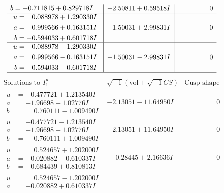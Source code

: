 \documentclass[1p]{elsarticle_modified}
\theoremstyle{definition}
\newcommand{\I}{\sqrt{-1}}
\begin{document}
$$\begin{array}{c|c|c}
\begin{aligned}
b &= -0.711815 + 0.829718 I\end{aligned}
 & -2.50811 + 0.59518 I & \phantom{-0.000000 } 0 \\ \hline\begin{aligned}
u &= \phantom{-}0.088978 + 1.290330 I \\
a &= \phantom{-}0.999566 + 0.163151 I \\
b &= -0.594033 + 0.601718 I\end{aligned}
 & -1.50031 + 2.99831 I & \phantom{-0.000000 } 0 \\ \hline\begin{aligned}
u &= \phantom{-}0.088978 - 1.290330 I \\
a &= \phantom{-}0.999566 - 0.163151 I \\
b &= -0.594033 - 0.601718 I\end{aligned}
 & -1.50031 - 2.99831 I & \phantom{-0.000000 } 0\\
 \hline 
 \end{array}$$\newpage$$\begin{array}{c|c|c}  
\text{Solutions to }I^u_{1}& \I (\text{vol} + \sqrt{-1}CS) & \text{Cusp shape}\\
 \hline 
\begin{aligned}
u &= -0.477721 + 1.213540 I \\
a &= -1.96698 - 1.02776 I \\
b &= \phantom{-}0.760111 - 1.009490 I\end{aligned}
 & -2.13051 - 11.64950 I & \phantom{-0.000000 } 0 \\ \hline\begin{aligned}
u &= -0.477721 - 1.213540 I \\
a &= -1.96698 + 1.02776 I \\
b &= \phantom{-}0.760111 + 1.009490 I\end{aligned}
 & -2.13051 + 11.64950 I & \phantom{-0.000000 } 0 \\ \hline\begin{aligned}
u &= \phantom{-}0.524657 + 1.202000 I \\
a &= -0.020882 - 0.610337 I \\
b &= -0.684439 + 0.810813 I\end{aligned}
 & \phantom{-}0.28445 + 2.16636 I & \phantom{-0.000000 } 0 \\ \hline\begin{aligned}
u &= \phantom{-}0.524657 - 1.202000 I \\
a &= -0.020882 + 0.610337 I \\

\end{aligned}
\end{array}$$
\end{document}
